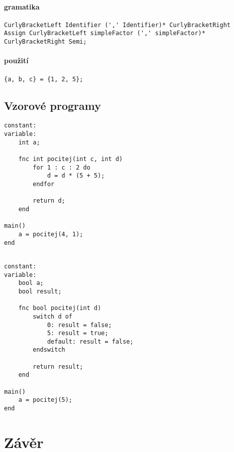 \documentclass{style}
\begin{document}
\subsubsection{gramatika}
\begin{lstlisting}
CurlyBracketLeft Identifier (',' Identifier)* CurlyBracketRight 
Assign CurlyBracketLeft simpleFactor (',' simpleFactor)* 
CurlyBracketRight Semi;
\end{lstlisting}

\subsubsection{použití}
\begin{lstlisting}
{a, b, c} = {1, 2, 5};
\end{lstlisting}

\section{Vzorové programy}
\begin{lstlisting}[frame=single]  % Start your code-block
constant:
variable:
    int a;

    fnc int pocitej(int c, int d)
        for 1 : c : 2 do
            d = d * (5 + 5);
        endfor

        return d;
    end

main()
    a = pocitej(4, 1);
end
\end{lstlisting}

\begin{lstlisting}[frame=single]  % Start your code-block

constant:
variable:
    bool a;
    bool result;

    fnc bool pocitej(int d)
        switch d of
            0: result = false;
            5: result = true;
            default: result = false;
        endswitch

        return result;
    end

main()
    a = pocitej(5);
end
\end{lstlisting}
\chapter{Závěr}
\end{document}
